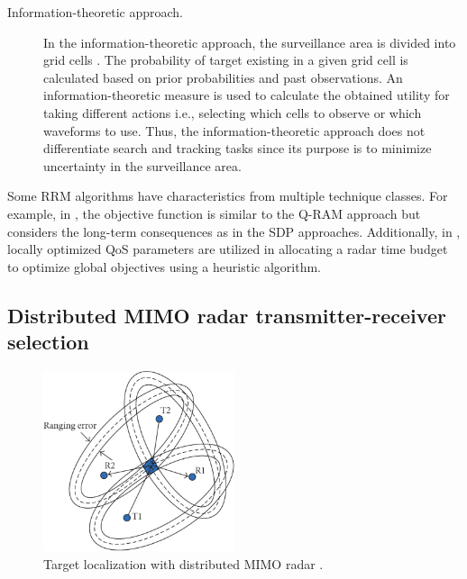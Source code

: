 \documentclass[english, 12pt, a4paper, elec, utf8, a-1b, online]{aaltothesis}
\numberwithin{equation}{section}
\begin{document}
\begin{description}
\item[Information-theoretic approach.]

In the information-theoretic approach, the surveillance area is divided into grid cells \cite{Kastella1997, Kreucher2004, Kreucher2005, Xu2010}.
The probability of target existing in a given grid cell is calculated based on prior probabilities and past observations.
An information-theoretic measure is used to calculate the obtained utility for taking different actions i.e., selecting which cells to observe or which waveforms to use.
Thus, the information-theoretic approach does not differentiate search and tracking tasks since its purpose is to minimize uncertainty in the surveillance area.

\end{description}


\noindent
Some RRM algorithms have characteristics from multiple technique classes. 
For example, in \cite{Byrne2015, Byrne2016}, the objective function is similar to the Q-RAM approach but considers the long-term consequences as in the SDP approaches.
Additionally, in \cite{Esfahani2012}, locally optimized QoS parameters are utilized in allocating a radar time budget to optimize global objectives using a heuristic algorithm.

\subsection{Distributed MIMO radar transmitter-receiver selection}\label{sec:TX_RX_selection_review}

\begin{figure}[b]
    \centering
    \includegraphics[width=0.5\textwidth]{figures/background/MIMO_TX_RX_selection.png}
    \caption{Target localization with distributed MIMO radar \cite{Sun2014}.}
    \label{fig:dist_MIMO_localization}
\end{figure}
\end{document}

